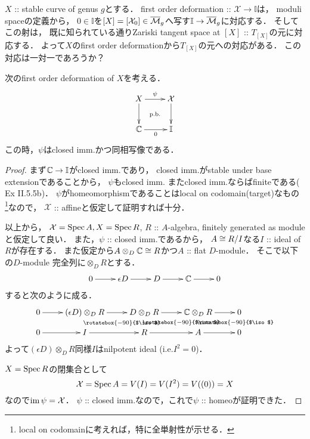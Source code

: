 \documentclass[a4paper]{jsarticle}
\makeatletter
\newcommand{\dualnum}{\mathbb{I}}
\newcommand{\famX}{\mathcal{X}}
\newcommand{\viso}{\rotatebox{-90}{$\iso$}}
\newcommand{\centerpb}{\ar@{}[lu]|{\text{p.b.}}}
\makeatother
\begin{document}
    \begin{Remark}
        $X$ :: stable curve of genus $g$とする．
        first order deformation :: $\famX \to \dualnum$は，
        moduli spaceの定義から，
        $0 \in \dualnum$を$[X]=[\famX_0] \in \barM_g$へ写す$\dualnum \to \barM_g$に対応する．
        そしてこの射は，
        既に知られている通りZariski tangent space at $[X]$ :: $T_{[X]}$の元に対応する．
        よって$X$のfirst order deformationから$T_{[X]}$の元への対応がある．
        この対応は一対一であろうか？
    \end{Remark}

    \begin{Lemma}\label{lemma:psi_is_imm_homeo}
        次のfirst order deformation of $X$を考える．
        \[\vcenter{\xymatrix{
            X \ar[r]^-{\psi} \ar[d]& \famX \ar[d] \\
            \C \ar[r]_-{0}& \dualnum
            \centerpb
        }}\]
        この時，$\psi$はclosed imm.かつ同相写像である．
    \end{Lemma}
    \begin{proof}
        まず$\C \to \dualnum$がclosed imm.であり，
        closed imm.がstable under base extensionであることから，
        $\psi$もclosed imm.
        またclosed imm.ならばfiniteである(\cite{HarAG} Ex II.5.5b)．
        $\psi$がhomeomorphismであることはlocal on codomain(target)なもの
        \footnote{ local on codomainに考えれば，特に全単射性が示せる． }なので，
        $\famX$ :: affineと仮定して証明すれば十分．
        
        以上から，
        $\famX=\Spec A, X=\Spec R$,
        $R$ :: $A$-algebra, finitely generated as module
        と仮定して良い．
        また，$\psi$ :: closed imm.であるから，
        $A \cong R/I$なる$I$ :: ideal of $R$が存在する．
        また仮定から$A \otimes_D \mathbb{C} \cong R$かつ$A$ :: flat $D$-module．
        そこで以下の$D$-module 完全列に$\otimes_D R$とする．
        \[\xymatrix{
            0 \ar[r]& \epsilon D \ar[r]& D \ar[r]& \C \ar[r]& 0
        }\]
        すると次のように成る．
        \[\xymatrix@R=10pt{
            0 \ar[r]& (\epsilon D)\otimes_D R \ar[r]& D \otimes_D R \ar[r]& \C \otimes_D R \ar[r]& 0 \\
            0 \ar[r]& I \ar@<5pt>@{}[u]_-{\viso} \ar[r]& R \ar@<5pt>@{}[u]_-{\viso}\ar[r]& A \ar@<5pt>@{}[u]_-{\viso}\ar[r]& 0 \\
        }\]
        よって$(\epsilon D)\otimes_D R$同様$I$はnilpotent ideal (i.e.$I^2=0$)．

        $X=\operatorname{Spec} R$の閉集合として
        \[ \famX=\Spec A=V(I)=V(I^2)=V((0))=X \]
        なので$\im \psi=\famX$．
        $\psi$ :: closed imm.なので，これで$\psi$ :: homeoが証明できた．
    \end{proof}
\end{document}
